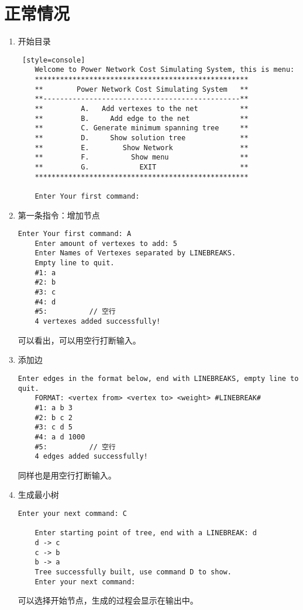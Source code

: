 \section{正常情况}
\begin{enumerate}
    \item 开始目录
\begin{lstlisting} [style=console]
    Welcome to Power Network Cost Simulating System, this is menu:
    ***************************************************
    **        Power Network Cost Simulating System   **
    **-----------------------------------------------**
    **         A.   Add vertexes to the net          **
    **         B.     Add edge to the net            **
    **         C. Generate minimum spanning tree     **
    **         D.     Show solution tree             **
    **         E.        Show Network                **
    **         F.          Show menu                 **
    **         G.            EXIT                    **
    ***************************************************
    
    Enter Your first command: 
\end{lstlisting}

    \item 第一条指令：增加节点
\begin{lstlisting}[style=console]
    Enter Your first command: A
    Enter amount of vertexes to add: 5
    Enter Names of Vertexes separated by LINEBREAKS.
    Empty line to quit.
    #1: a
    #2: b
    #3: c
    #4: d
    #5:          // 空行
    4 vertexes added successfully!
\end{lstlisting}
    可以看出，可以用空行打断输入。

    \item 添加边
\begin{lstlisting}[style=console]
    Enter edges in the format below, end with LINEBREAKS, empty line to quit.
    FORMAT: <vertex from> <vertex to> <weight> #LINEBREAK#
    #1: a b 3
    #2: b c 2
    #3: c d 5
    #4: a d 1000
    #5:          // 空行
    4 edges added successfully!
\end{lstlisting}
    同样也是用空行打断输入。

    \item 生成最小树
\begin{lstlisting}[style=console]
    Enter your next command: C

    Enter starting point of tree, end with a LINEBREAK: d
    d -> c
    c -> b
    b -> a
    Tree successfully built, use command D to show.
    Enter your next command: 
\end{lstlisting}
    可以选择开始节点，生成的过程会显示在输出中。


\end{enumerate}
